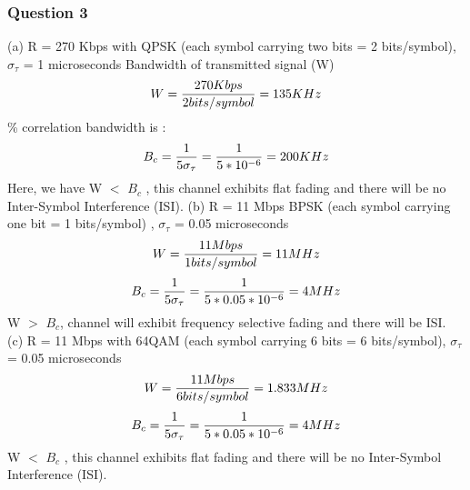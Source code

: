 \documentclass[12pt]{article}
\begin{document}
\newpage
\subsubsection*{Question 3}
\vspace{5mm}
(a) R = 270 Kbps with QPSK (each symbol carrying two bits = 2 bits/symbol), 
\(\sigma_\tau\) = 1 microseconds
\newline
Bandwidth of transmitted signal (W)
\newline
\begin{equation*}
W = { 270 Kbps\over2 bits/symbol }	 = 135 KHz
\end{equation*}
\% correlation bandwidth is :
\begin{equation*}
	B_c = { 1 \over {5\sigma_\tau}} = {1\over{5*10^{-6}}} = 200 KHz
\end{equation*}
\newline
Here, we have W \(<\) \(B_c\) , this channel exhibits flat fading and there will be no Inter-Symbol Interference (ISI).
\newline
\newline
(b) R =  11 Mbps BPSK (each symbol carrying one bit = 1 bits/symbol) , \(\sigma_\tau\) = 0.05 microseconds
\newline
\begin{equation*}
W = { 11 Mbps\over1 bits/symbol }	 = 11 MHz
\end{equation*}
\newline
\begin{equation*}
	B_c = { 1 \over {5\sigma_\tau}} = {1\over{5*0.05*10^{-6}}} = 4 MHz
\end{equation*}
\newline
W \(>\) \(B_c\), channel will exhibit frequency selective fading and there will be ISI.
\newline
\newline
(c) R = 11 Mbps with 64QAM (each symbol carrying 6 bits = 6 bits/symbol), 
\(\sigma_\tau\) = 0.05 microseconds
\newline
\begin{equation*}
W = { 11 Mbps\over6 bits/symbol }	 = 1.833 MHz
\end{equation*}
\newline
\begin{equation*}
	B_c = { 1 \over {5\sigma_\tau}} = {1\over{5*0.05*10^{-6}}} = 4 MHz
\end{equation*}
\newline
W \(<\) \(B_c\) , this channel exhibits flat fading and there will be no Inter-Symbol Interference (ISI).
\end{document}
